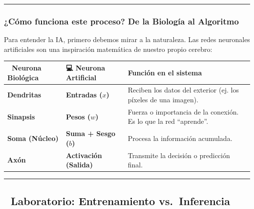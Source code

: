 \documentclass[
  spanish,
  letterpaper,
  DIV=11,
  numbers=noendperiod,
  oneside]{scrreprt}
\newcounter{none} %
\begin{document}
\begin{center}\rule{0.5\linewidth}{0.5pt}\end{center}

\subsubsection{¿Cómo funciona este proceso? De la Biología al
Algoritmo}\label{cuxf3mo-funciona-este-proceso-de-la-biologuxeda-al-algoritmo}

Para entender la IA, primero debemos mirar a la naturaleza. Las redes
neuronales artificiales son una inspiración matemática de nuestro propio
cerebro:

{\def\LTcaptype{none} %
\begin{longtable}[]{@{}
  >{\raggedright\arraybackslash}p{}
  >{\raggedright\arraybackslash}p{}
  >{\raggedright\arraybackslash}p{}@{}}
\toprule\noalign{}
\begin{minipage}[b]{\linewidth}\raggedright
🧠 Neurona Biológica
\end{minipage} & \begin{minipage}[b]{\linewidth}\raggedright
💻 Neurona Artificial
\end{minipage} & \begin{minipage}[b]{\linewidth}\raggedright
Función en el sistema
\end{minipage} \\
\midrule\noalign{}
\endhead
\bottomrule\noalign{}
\endlastfoot
\textbf{Dendritas} & \textbf{Entradas (\(x\))} & Reciben los datos del
exterior (ej. los píxeles de una imagen). \\
\textbf{Sinapsis} & \textbf{Pesos (\(w\))} & Fuerza o importancia de la
conexión. Es lo que la red ``aprende''. \\
\textbf{Soma (Núcleo)} & \textbf{Suma + Sesgo (\(b\))} & Procesa la
información acumulada. \\
\textbf{Axón} & \textbf{Activación (Salida)} & Transmite la decisión o
predicción final. \\
\end{longtable}
}

\begin{center}\rule{0.5\linewidth}{0.5pt}\end{center}

\subsection{🔬 Laboratorio: Entrenamiento
vs.~Inferencia}\label{laboratorio-entrenamiento-vs.-inferencia}
\end{document}
